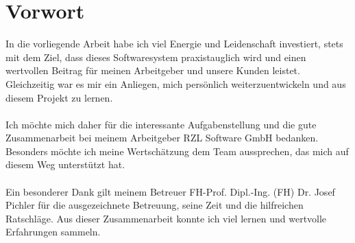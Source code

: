 \chapter{Vorwort}
In die vorliegende Arbeit habe ich viel Energie und Leidenschaft investiert, stets mit dem Ziel, dass dieses Softwaresystem praxistauglich wird und einen wertvollen Beitrag für meinen Arbeitgeber und unsere Kunden leistet. Gleichzeitig war es mir ein Anliegen, mich persönlich weiterzuentwickeln und aus diesem Projekt zu lernen.\\
\\
Ich möchte mich daher für die interessante Aufgabenstellung und die gute Zusammenarbeit bei meinem Arbeitgeber RZL Software GmbH bedanken. Besonders möchte ich meine Wertschätzung dem Team aussprechen, das mich auf diesem Weg unterstützt hat.\\
\\
Ein besonderer Dank gilt meinem Betreuer FH-Prof. Dipl.-Ing. (FH) Dr. Josef Pichler für die ausgezeichnete Betreuung, seine Zeit und die hilfreichen Ratschläge. Aus dieser Zusammenarbeit konnte ich viel lernen und wertvolle Erfahrungen sammeln.

